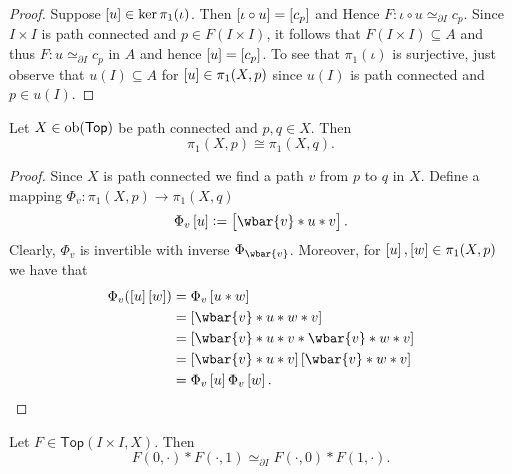 \begin{proof}
	Suppose $\sbr{u} \in \ker\pi_1(\iota)$. Then $\sbr{\iota \circ u} = \sbr[0]{c_p}$ and Hence $F : \iota \circ u \simeq_{\partial I} c_p$. Since $I \times I$ is path connected and $p \in F(I \times I)$, it follows that $F(I \times I) \subseteq A$ and thus $F : u \simeq_{\partial I} c_p$ in $A$ and hence $\sbr{u} = \sbr[0]{c_p}$. To see that $\pi_1(\iota)$ is surjective, just observe that $u(I) \subseteq A$ for $\sbr{u} \in \pi_1(X,p)$ since $u(I)$ is path connected and $p \in u(I)$.
\end{proof}

\begin{lemma}
	\label{lem:fundamental_group_path_connected}
	Let $X \in \operatorname{ob}(\mathsf{Top})$ be path connected and $p,q \in X$. Then 
	\begin{equation*}
		\pi_1(X,p) \cong \pi_1(X,q).	
	\end{equation*}	
\end{lemma}

\begin{proof}
	Since $X$ is path connected we find a path $v$ from $p$ to $q$ in $X$. Define a mapping $\Phi_v : \pi_1(X,p) \to \pi_1(X,q)$ 
	\begin{equation*}
		\Phi_v\sbr{u} := \sbr{\wbar{v} \ast u \ast v}.
	\end{equation*}
	Clearly, $\Phi_v$ is invertible with inverse $\Phi_{\wbar{v}}$. Moreover, for $\sbr{u},\sbr{w} \in \pi_1(X,p)$ we have that
	\begin{align*}
		\Phi_v(\sbr{u}\sbr{w}) &= \Phi_v\sbr{u \ast w}\\
		&= \sbr[0]{\wbar{v} \ast u \ast w \ast v}\\
		&= \sbr[0]{\wbar{v} \ast u \ast v \ast \wbar{v} \ast w \ast v}\\
		&= \sbr[0]{\wbar{v} \ast u \ast v}\sbr[0]{\wbar{v} \ast w \ast v}\\
		&= \Phi_v\sbr{u}\Phi_v\sbr{w}.
	\end{align*}
\end{proof}

\begin{lemma}
	\label{lem:square_lemma}
	Let $F \in \mathsf{Top}(I \times I,X)$. Then
	\begin{equation*}
		F(0,\cdot) \ast F(\cdot,1) \simeq_{\partial I} F(\cdot,0) \ast F(1,\cdot).	
	\end{equation*}
\end{lemma}

